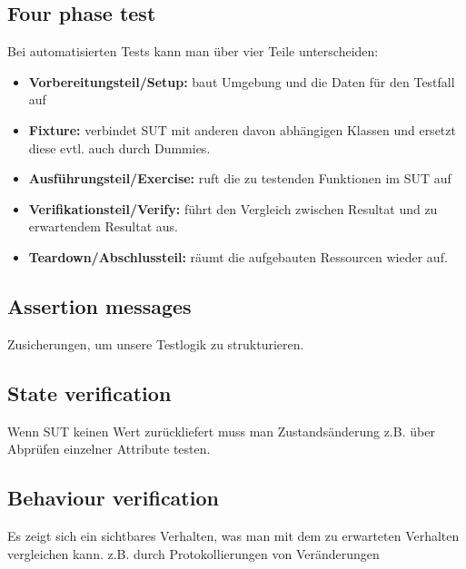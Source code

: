 \documentclass{book}
\begin{document}
    \subsection{Four phase test}
    Bei automatisierten Tests kann man über vier Teile unterscheiden:
    \begin{itemize}
        \item \textbf{Vorbereitungsteil/Setup:} baut Umgebung und die Daten für den Testfall auf
        \item \textbf{Fixture:} verbindet SUT mit anderen davon abhängigen Klassen und ersetzt diese evtl. auch durch Dummies.
        \item \textbf{Ausführungsteil/Exercise:} ruft die zu testenden Funktionen im SUT auf
        \item \textbf{Verifikationsteil/Verify:} führt den Vergleich zwischen Resultat und zu erwartendem Resultat aus.
        \item \textbf{Teardown/Abschlussteil:} räumt die aufgebauten Ressourcen wieder auf.
    \end{itemize}
    \subsection{Assertion messages}
    Zusicherungen, um unsere Testlogik zu strukturieren.
    \subsection{State verification}
    Wenn SUT keinen Wert zurückliefert muss man Zustandsänderung z.B. über Abprüfen einzelner Attribute testen.
    \subsection{Behaviour verification}
    Es zeigt sich ein sichtbares Verhalten, was man mit dem zu erwarteten Verhalten vergleichen kann. z.B. durch Protokollierungen von Veränderungen
\end{document}
